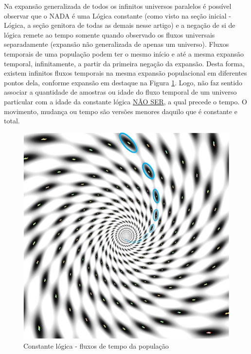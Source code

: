Na expansão generalizada de todos os infinitos universos paralelos é possível observar que o NADA é uma Lógica constante (como visto na seção inicial - Lógica, a seção genitora de todas as demais nesse artigo) e a negação de si de lógica remete ao tempo somente quando observado os fluxos universais separadamente (expansão não generalizada de apenas um universo). Fluxos temporais de uma população podem ter o mesmo início e até a mesma expansão temporal, infinitamente, a partir da primeira negação da expansão. Desta forma, existem infinitos fluxos temporais na mesma expansão populacional em diferentes pontos dela, conforme expansão em destaque na Figura \ref{fig:consciousness_constant_time}. Logo, não faz sentido associar a quantidade de amostras ou idade do fluxo temporal de um universo particular com a idade da constante lógica \underline{NÃO SER}, a qual precede o tempo. O movimento, mudança ou tempo são versões menores daquilo que é constante e total.
	\begin{figure}[H]
	\caption{Constante lógica - fluxos de tempo da população}
	\label{fig:consciousness_constant_time}
	\centering
	\includegraphics[scale=.6]{sections/images/consciousness_constant_time.jpg}
	\end{figure}

